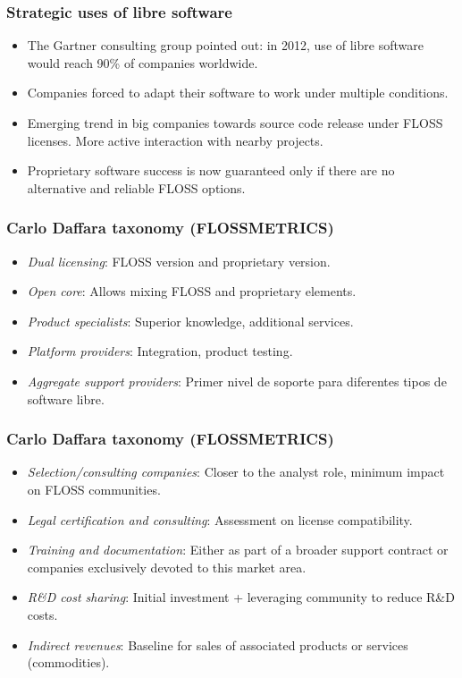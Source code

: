 \begin{frame}
 \frametitle{Strategic uses of libre software}
 \begin{itemize}
  \item The Gartner consulting group pointed out: in 2012, use of libre software would reach 90\% of companies worldwide.
  \item Companies forced to adapt their software to work under multiple conditions.
  \item Emerging trend in big companies towards source code release under FLOSS licenses.
More active interaction with nearby projects.
  \item Proprietary software success is now guaranteed only if there are no alternative and reliable FLOSS options.
 \end{itemize}
\end{frame}


\begin{frame}
 \frametitle{Carlo Daffara taxonomy (FLOSSMETRICS)}
 \begin{itemize}
  \item \textit{Dual licensing}: FLOSS version and proprietary version.
  \item \textit{Open core}: Allows mixing FLOSS and proprietary elements.
  \item \textit{Product specialists}: Superior knowledge, additional services.
  \item \textit{Platform providers}: Integration, product testing.
  \item \textit{Aggregate support providers}: Primer nivel de soporte para diferentes
tipos de software libre.
  \end{itemize}
  \end{frame}
  
  \begin{frame}
 \frametitle{Carlo Daffara taxonomy (FLOSSMETRICS)}
 \begin{itemize}
\item \textit{Selection/consulting companies}: Closer to the analyst role, minimum impact on FLOSS communities.
  \item \textit{Legal certification and consulting}: Assessment on license compatibility.
  \item \textit{Training and documentation}: Either as part of a broader support contract or companies exclusively devoted
to this market area.
  \item \textit{R\&D cost sharing}: Initial investment + leveraging community to reduce R\&D costs.
  \item \textit{Indirect revenues}: Baseline for sales of associated products or services (commodities).
 \end{itemize}
\end{frame}


